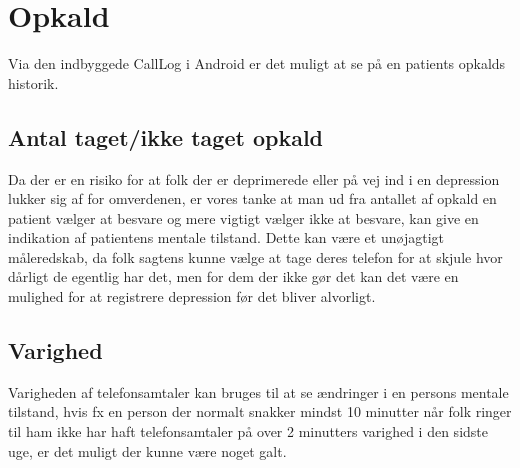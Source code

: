 \section{Opkald}
Via den indbyggede CallLog i Android er det muligt at se på en patients opkalds historik.

\subsection{Antal taget/ikke taget opkald}
Da der er en risiko for at folk der er deprimerede eller på vej ind i en depression lukker sig af for omverdenen, er vores tanke at man ud fra antallet af opkald en patient vælger at besvare og mere vigtigt vælger ikke at besvare, kan give en indikation af patientens mentale tilstand.
Dette kan være et unøjagtigt måleredskab, da folk sagtens kunne vælge at tage deres telefon for at skjule hvor dårligt de egentlig har det, men for dem der ikke gør det kan det være en mulighed for at registrere depression før det bliver alvorligt.

\subsection{Varighed}
Varigheden af telefonsamtaler kan bruges til at se ændringer i en persons mentale tilstand, hvis fx en person der normalt snakker mindst 10 minutter når folk ringer til ham ikke har haft telefonsamtaler på over 2 minutters varighed i den sidste uge, er det muligt der kunne være noget galt.

